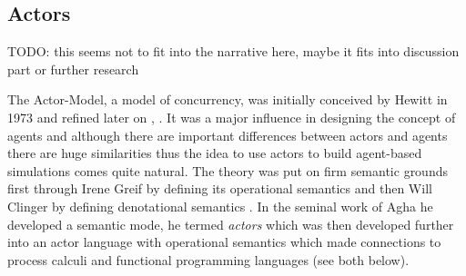 	

\subsection{Actors}
\label{sec:actors}
TODO: this seems not to fit into the narrative here, maybe it fits into discussion part or further research

The Actor-Model, a model of concurrency, was initially conceived by Hewitt in 1973 \cite{hewitt_universal_1973} and refined later on \cite{hewitt_what_2007}, \cite{hewitt_actor_2010}. It was a major influence in designing the concept of agents and although there are important differences between actors and agents there are huge similarities thus the idea to use actors to build agent-based simulations comes quite natural. The theory was put on firm semantic grounds first through Irene Greif by defining its operational semantics \cite{grief_semantics_1975} and then Will Clinger by defining denotational semantics \cite{clinger_foundations_1981}. In the seminal work of Agha \cite{agha_actors:_1986} he developed a semantic mode, he termed \textit{actors} which was then developed further \cite{agha_foundation_1997} into an actor language with operational semantics which made connections to process calculi and functional programming languages (see both below). 

